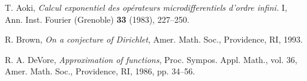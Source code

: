 \documentclass{amsart}
\theoremstyle{definition}
\theoremstyle{remark}
\numberwithin{equation}{section}
\begin{document}

\begin{thebibliography}{10}

 T. Aoki, \textit{Calcul exponentiel des op\'erateurs
microdifferentiels d'ordre infini.} I, Ann. Inst. Fourier (Grenoble)
\textbf{33} (1983), 227--250.

 R. Brown, \textit{On a conjecture of Dirichlet},
Amer. Math. Soc., Providence, RI, 1993.

 R. A. DeVore, \textit{Approximation of functions},
Proc. Sympos. Appl. Math., vol. 36,
Amer. Math. Soc., Providence, RI, 1986, pp. 34--56.

\end{thebibliography}
\end{document}
